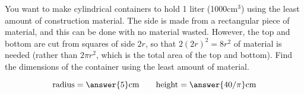 \documentclass{ximera}
\author{Bart Snapp}
\begin{document}
\begin{exercise}

  You want to make cylindrical containers to hold 1 liter (1000$\text{cm}^3$) using the
  least amount of construction material.  The side is made from a
  rectangular piece of material, and this can be done with no material
  wasted.  However, the top and bottom are cut from squares of side
  $2r$, so that $2(2r)^2=8r^2$ of material is needed (rather than
  $2\pi r^2$, which is the total area of the top and bottom).  Find
  the dimensions of the container using the least amount of material.
  \begin{prompt}
  \[
  \text{radius}=\answer{5}\text{cm}\qquad\text{height}=\answer{40/\pi}\text{cm}
  \]
  \end{prompt}
\end{exercise}
\end{document}
